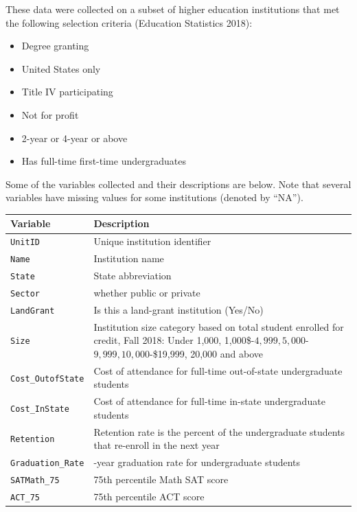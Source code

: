 \documentclass[
]{report}
\begin{document}
These data were collected on a subset of higher education institutions that met the following selection criteria (Education Statistics 2018):

\begin{itemize}
\item
  Degree granting
\item
  United States only
\item
  Title IV participating
\item
  Not for profit
\item
  2-year or 4-year or above
\item
  Has full-time first-time undergraduates
\end{itemize}

Some of the variables collected and their descriptions are below. Note that several variables have missing values for some institutions (denoted by ``NA'').

\begin{longtable}[]{@{}
  >{\raggedright\arraybackslash}p{}
  >{\raggedright\arraybackslash}p{}@{}}
\toprule\noalign{}
\begin{minipage}[b]{\linewidth}\raggedright
\textbf{Variable}
\end{minipage} & \begin{minipage}[b]{\linewidth}\raggedright
\textbf{Description}
\end{minipage} \\
\midrule\noalign{}
\endhead
\bottomrule\noalign{}
\endlastfoot
\texttt{UnitID} & Unique institution identifier \\
\texttt{Name} & Institution name \\
\texttt{State} & State abbreviation \\
\texttt{Sector} & whether public or private \\
\texttt{LandGrant} & Is this a land-grant institution (Yes/No) \\
\texttt{Size} & Institution size category based on total student enrolled for credit, Fall 2018: Under 1,000, 1,000\$-\(4,999, 5,000\)-\(9,999, 10,000\)-\$19,999, 20,000 and above \\
\texttt{Cost\_OutofState} & Cost of attendance for full-time out-of-state undergraduate students \\
\texttt{Cost\_InState} & Cost of attendance for full-time in-state undergraduate students \\
\texttt{Retention} & Retention rate is the percent of the undergraduate students that re-enroll in the next year \\
\texttt{Graduation\_Rate} & 6-year graduation rate for undergraduate students \\
\texttt{SATMath\_75} & 75th percentile Math SAT score \\
\texttt{ACT\_75} & 75th percentile ACT score \\
\end{longtable}
\end{document}
